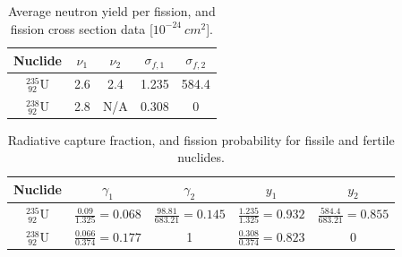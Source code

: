 \begin{table}[!hbp]
\begin{center}
\begin{tabular}{|c|c|c|c|c|}
\hline
Nuclide &	  $\nu_1$ &	$\nu_2$ & $\sigma_{f,1}$ & $\sigma_{f,2} $ \\
\hline
$^{235} _{~92} \text{U}$   & 2.6 & 2.4 & 1.235  &  584.4 \\
\hline
$^{238} _{~92} \text{U}$   & 2.8 & N/A & 0.308 &  0   \\
\hline
\end{tabular}	
\end{center}
\caption{Average neutron yield per fission, and fission cross section data [$10^{-24}~cm^2$]. }
\label{tbl:fission_data}
\end{table}
%
%
%
\begin{table}[!hbp]
\begin{center}
\begin{tabular}{|c|c|c|c|c|}
\hline
Nuclide &	 $\gamma_1$ & $\gamma_2$ &  $y_1$ & $y_2$ \\
\hline
$^{235} _{~92} \text{U}$   & $\frac{0.09}{1.325}=0.068$ & $\frac{98.81}{683.21}=0.145$ & $\frac{1.235}{1.325}=0.932$ & $\frac{584.4}{683.21}=0.855$ \\
\hline
$^{238} _{~92} \text{U}$   &  $\frac{0.066}{0.374}=0.177 $  & 1 &  $\frac{0.308}{0.374}=0.823$ & 0 \\
\hline
\end{tabular}	
\end{center}
\caption{Radiative capture fraction, and fission probability for fissile and fertile nuclides.}
\label{tbl:fission_data_2}
\end{table}


